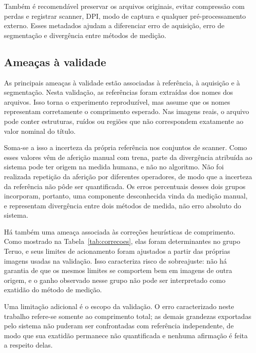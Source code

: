 \documentclass[12pt]{article}
\begin{document}
Também é recomendável preservar os arquivos originais, evitar compressão com perdas e registrar scanner, DPI, modo de captura e qualquer pré-processamento externo. Esses metadados ajudam a diferenciar erro de aquisição, erro de segmentação e divergência entre métodos de medição.

\subsection{Ameaças à validade}
\label{sec:ameacas}

As principais ameaças à validade estão associadas à referência, à aquisição e à segmentação. Nesta validação, as referências foram extraídas dos nomes dos arquivos. Isso torna o experimento reproduzível, mas assume que os nomes representam corretamente o comprimento esperado. Nas imagens reais, o arquivo pode conter estruturas, ruídos ou regiões que não correspondem exatamente ao valor nominal do título.

Soma-se a isso a incerteza da própria referência nos conjuntos de scanner. Como esses valores vêm de aferição manual com trena, parte da divergência atribuída ao sistema pode ter origem na medida humana, e não no algoritmo. Não foi realizada repetição da aferição por diferentes operadores, de modo que a incerteza da referência não pôde ser quantificada. Os erros percentuais desses dois grupos incorporam, portanto, uma componente desconhecida vinda da medição manual, e representam divergência entre dois métodos de medida, não erro absoluto do sistema.

Há também uma ameaça associada às correções heurísticas de comprimento. Como mostrado na Tabela~\ref{tab:correcoes}, elas foram determinantes no grupo Teruo, e seus limites de acionamento foram ajustados a partir das próprias imagens usadas na validação. Isso caracteriza risco de sobreajuste: não há garantia de que os mesmos limites se comportem bem em imagens de outra origem, e o ganho observado nesse grupo não pode ser interpretado como exatidão do método de medição.

Uma limitação adicional é o escopo da validação. O erro caracterizado neste trabalho refere-se somente ao comprimento total; as demais grandezas exportadas pelo sistema não puderam ser confrontadas com referência independente, de modo que sua exatidão permanece não quantificada e nenhuma afirmação é feita a respeito delas.
\end{document}
